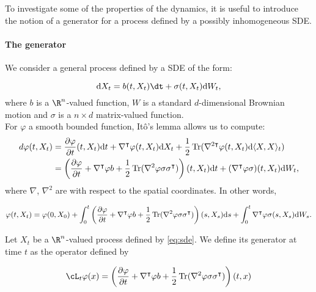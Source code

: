 To investigate some of the properties of the dynamics, it is useful to introduce the notion of a generator for a process defined by a possibly inhomogeneous SDE.
\paragraph{The generator}
We consider a general process defined by a SDE of the form:

\begin{equation}
    \label{eq:sde}
    \mathrm{d}X_t=b(t,X_t)\dt + \sigma(t,X_t)\mathrm{d}W_t,
\end{equation}
where $b$ is a $\R^n$-valued function, $W$ is a standard $d$-dimensional Brownian motion and $\sigma$ is a $n\times d$ matrix-valued function.\\
For $\varphi$ a smooth bounded function, Itô's lemma allows us to compute:
\begin{align*}
    d\varphi(t,X_t) &=\frac{\partial \varphi}{\partial t}(t,X_t)\text dt + \nabla^\intercal \varphi(t,X_t) \text dX_t + \frac12 \operatorname{Tr}(\nabla^{2\intercal}\varphi(t,X_t)\text d\langle X ,X\rangle _t)\\
    &=\left( \frac{\partial \varphi}{\partial t} + \nabla^{\intercal}\varphi b + \frac12 \operatorname{Tr}(\nabla^2\varphi \sigma\sigma^\intercal) \right)(t,X_t) \text dt+ (\nabla^\intercal \varphi\sigma )(t,X_t)\text dW_t,
\end{align*}
where $\nabla$, $\nabla^2$ are with respect to the spatial coordinates. In other words,


\begin{equation}
    \label{eq:ito}
    \varphi(t,X_t)= \varphi(0,X_0)+\int_0^t\left( \frac{\partial \varphi}{\partial t} + \nabla^\intercal\varphi b + \frac12 \operatorname{Tr}(\nabla^2\varphi\sigma\sigma^\intercal) \right)(s,X_s) \text ds + \int_0^t\nabla^\intercal \varphi\sigma(s,X_s)\text dW_s.
\end{equation}

    \begin{definition}
        Let $X_t$ be a $\R^n$-valued process defined by \ref{eq:sde}. We define its generator at time $t$ as the operator defined by

        \begin{equation}
            \label{Generator}
            \cL_t \varphi(x)=\left(\frac{\partial \varphi}{\partial t} + \nabla^\intercal\varphi b + \frac12 \operatorname{Tr}(\nabla^2\varphi \sigma\sigma^\intercal)\right)(t,x)
        \end{equation}

    \end{definition}

